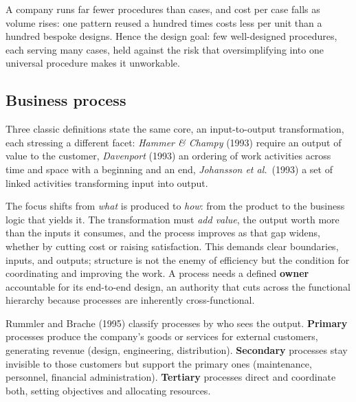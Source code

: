 A company runs far fewer procedures than cases, and cost per case falls as volume rises: one pattern reused a hundred times costs less per unit than a hundred bespoke designs. Hence the design goal: few well-designed procedures, each serving many cases, held against the risk that oversimplifying into one universal procedure makes it unworkable.

\subsection{Business process}

Three classic definitions state the same core, an input-to-output transformation, each stressing a different facet: \emph{Hammer \& Champy} (1993) require an output of value to the customer, \emph{Davenport} (1993) an ordering of work activities across time and space with a beginning and an end, \emph{Johansson et al.}\ (1993) a set of linked activities transforming input into output.

The focus shifts from \emph{what} is produced to \emph{how}: from the product to the business logic that yields it. The transformation must \emph{add value}, the output worth more than the inputs it consumes, and the process improves as that gap widens, whether by cutting cost or raising satisfaction. This demands clear boundaries, inputs, and outputs; structure is not the enemy of efficiency but the condition for coordinating and improving the work. A process needs a defined \textbf{owner} accountable for its end-to-end design, an authority that cuts across the functional hierarchy because processes are inherently cross-functional.

Rummler and Brache (1995) classify processes by who sees the output. \textbf{Primary} processes produce the company's goods or services for external customers, generating revenue (design, engineering, distribution). \textbf{Secondary} processes stay invisible to those customers but support the primary ones (maintenance, personnel, financial administration). \textbf{Tertiary} processes direct and coordinate both, setting objectives and allocating resources.